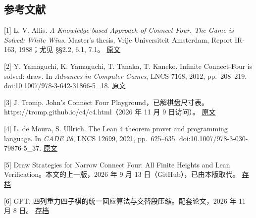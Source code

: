 \documentclass[
  a4paper,
]{article}
\begin{document}
\subsection{参考文献}\label{ux53c2ux8003ux6587ux732e}

{[}1{]} L. V. Allis. \emph{A Knowledge-based Approach of Connect-Four.
The Game is Solved: White Wins.} Master's thesis, Vrije Universiteit
Amsterdam, Report IR-163, 1988；尤见 §§2.2, 6.1, 7.1。
\href{https://tromp.github.io/c4/connect4_thesis.pdf\#page=13}{原文}

{[}2{]} Y. Yamaguchi, K. Yamaguchi, T. Tanaka, T. Kaneko. Infinite
Connect-Four is solved: draw. In \emph{Advances in Computer Games}, LNCS
7168, 2012, pp.~208--219. doi:10.1007/978-3-642-31866-5\_18.
\href{https://doi.org/10.1007/978-3-642-31866-5_18}{原文}

{[}3{]} J. Tromp. John's Connect Four
Playground，已解棋盘尺寸表。https://tromp.github.io/c4/c4.html（2026 年
11 月 9 日访问）。 \href{https://tromp.github.io/c4/c4.html}{原文}

{[}4{]} L. de Moura, S. Ullrich. The Lean 4 theorem prover and
programming language. In \emph{CADE 28}, LNCS 12699, 2021, pp.~625--635.
doi:10.1007/978-3-030-79876-5\_37.
\href{https://doi.org/10.1007/978-3-030-79876-5_37}{原文}

{[}5{]} Draw Strategies for Narrow Connect Four: All Finite Heights and
Lean Verification。本文的上一版，2026 年 9 月 13
日（GitHub），已由本版取代。
\href{https://github.com/wugang6812/narrow-connect-four/tree/v0.1.0}{存档}

{[}6{]} GPT. 四列重力四子棋的统一回应算法与交替段压缩。配套论文，2026 年
11 月 8 日。
\href{https://github.com/wugang6812/narrow-connect-four/blob/main/papers/algorithm-zh.pdf}{存档}
\end{document}
